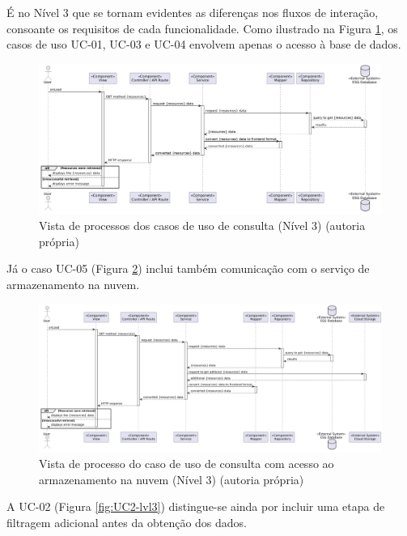 É no Nível 3 que se tornam evidentes as diferenças nos fluxos de interação, consoante os requisitos de cada funcionalidade. Como ilustrado na Figura \ref{fig:UC134-lvl3}, os casos de uso UC-01, UC-03 e UC-04 envolvem apenas o acesso à base de dados.

\begin{figure}[H]
\centering
\includegraphics[width=\linewidth]{frontmatter/assets/diagrams/Process Views/LVL3/uc134-lvl3.png}
\caption{Vista de processos dos casos de uso de consulta (Nível 3) (autoria própria)}
\label{fig:UC134-lvl3}
\end{figure}

Já o caso UC-05 (Figura \ref{fig:UC5-lvl3}) inclui também comunicação com o serviço de armazenamento na nuvem.

\begin{figure}[H]
\centering
\includegraphics[width=\linewidth]{frontmatter/assets/diagrams/Process Views/LVL3/uc-05-lvl3.png}
\caption{Vista de processo do caso de uso de consulta com acesso ao armazenamento na nuvem (Nível 3) (autoria própria)}
\label{fig:UC5-lvl3}
\end{figure}

A UC-02 (Figura \ref{fig:UC2-lvl3}) distingue-se ainda por incluir uma etapa de filtragem adicional antes da obtenção dos dados.

